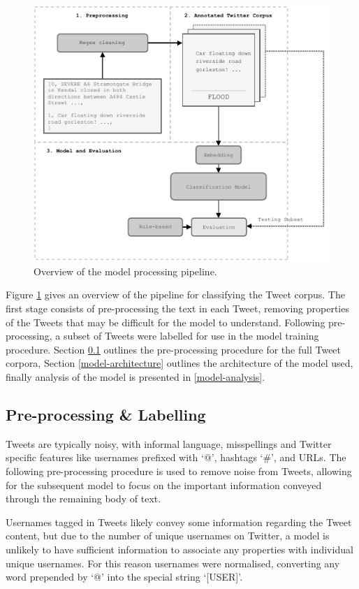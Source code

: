 \documentclass[a4paper, notitlepage]{extreport}
\begin{document}
\begin{figure}[tb]

{\centering \includegraphics[width=.75\linewidth]{figures/figure1_template} 

}

\caption{Overview of the model processing pipeline.}\label{fig:workflow}
\end{figure}

Figure \ref{fig:workflow} gives an overview of the pipeline for
classifying the Tweet corpus. The first stage consists of pre-processing
the text in each Tweet, removing properties of the Tweets that may be
difficult for the model to understand. Following pre-processing, a
subset of Tweets were labelled for use in the model training procedure.
Section \ref{pre-processing-labelling} outlines the pre-processing
procedure for the full Tweet corpora, Section \ref{model-architecture}
outlines the architecture of the model used, finally analysis of the
model is presented in \ref{model-analysis}.

\hypertarget{pre-processing-labelling}{%
\subsection{Pre-processing \&
Labelling}\label{pre-processing-labelling}}

Tweets are typically noisy, with informal language, misspellings and
Twitter specific features like usernames prefixed with `@', hashtags
`\#', and URLs. The following pre-processing procedure is used to remove
noise from Tweets, allowing for the subsequent model to focus on the
important information conveyed through the remaining body of text.

Usernames tagged in Tweets likely convey some information regarding the
Tweet content, but due to the number of unique usernames on Twitter, a
model is unlikely to have sufficient information to associate any
properties with individual unique usernames. For this reason usernames
were normalised, converting any word prepended by `@' into the special
string `{[}USER{]}'.
\end{document}
